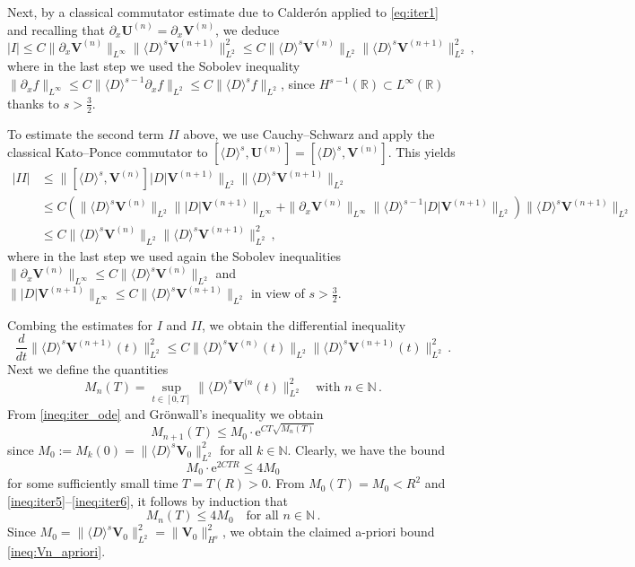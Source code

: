 \documentclass[11pt,reqno]{amsart}
\theoremstyle{definition}
\theoremstyle{remark}
\theoremstyle{remark}
\numberwithin{equation}{section}
\newcommand{\N}{\mathbb{N}}
\newcommand{\R}{\mathbb{R}}
\newcommand{\pt}{\partial}
\newcommand{\be}{\begin{equation}}
\newcommand{\ee}{\end{equation}}
\newcommand{\eu}{\mathrm{e}}
\newcommand{\Vb}{\mathbf{V}}
\newcommand{\Ub}{\mathbf{U}}
\newcommand{\Dsr}{\langle D \rangle}
\begin{document}
\begin{appendix}
Next, by a classical commutator estimate due to Calder\'on applied to \eqref{eq:iter1} and recalling that $\pt_x \Ub^{(n)} = \pt_x \Vb^{(n)}$, we deduce  
$$
|I|  \leq C \| \pt_x \Vb^{(n)} \|_{L^\infty} \| \Dsr^s \Vb^{(n+1)} \|_{L^2}^2 \leq C \| \Dsr^s  \Vb^{(n)} \|_{L^2}  \| \Dsr^s \Vb^{(n+1)} \|_{L^2}^2 \, ,
$$
where in the last step we used the Sobolev inequality $\| \pt_x f \|_{L^\infty}  \leq C \| \Dsr^{s-1} \pt_x f \|_{L^2} \leq C \| \Dsr^{s} f \|_{L^2}$, since $H^{s-1}(\R) \subset L^\infty(\R)$ thanks to $s > \frac{3}{2}$.

To estimate the second term $II$ above, we use Cauchy--Schwarz and apply the classical Kato--Ponce commutator to $[\Dsr^s, \Ub^{(n)}] = [\Dsr^s, \Vb^{(n)}]$. This yields
\begin{align*}
|II| & \leq \| [\Dsr^s, \Vb^{(n)}] |D| \Vb^{(n+1)} \|_{L^2} \| \Dsr^s \Vb^{(n+1)} \|_{L^2} \\
& \leq C ( \| \Dsr^s \Vb^{(n)} \|_{L^2} \| |D| \Vb^{(n+1)} \|_{L^\infty} + \| \pt_x \Vb^{(n)} \|_{L^\infty} \|  \Dsr^{s-1} |D| \Vb^{(n+1)} \|_{L^2}  ) \| \Dsr^s \Vb^{(n+1)} \|_{L^2} \\
& \leq C \| \Dsr^s \Vb^{(n)} \|_{L^2} \| \Dsr^s \Vb^{(n+1)} \|_{L^2}^2 \, ,
\end{align*}
where in the last step we used again the Sobolev inequalities $\| \pt_x \Vb^{(n)} \|_{L^\infty} \leq C \| \Dsr^s \Vb^{(n)} \|_{L^2}$ and $\| |D| \Vb^{(n+1)} \|_{L^\infty} \leq C \| \Dsr^s \Vb^{(n+1)} \|_{L^2}$ in view of $s > \frac{3}{2}$.


Combing the estimates for $I$ and $II$, we obtain the differential inequality
\be \label{ineq:iter_ode}
 \frac{d}{dt} \big \| \Dsr^s \Vb^{(n+1)}(t) \big \|_{L^2}^2  \leq C \| \Dsr^s \Vb^{(n)}(t) \|_{L^2} \| \Dsr^s \Vb^{(n+1)}(t) \|_{L^2}^2  \, .
\ee
Next we define the quantities
$$
M_n(T) = \sup_{t \in [0,T]} \big \| \Dsr^s \Vb^{(n}(t) \big \|_{L^2}^2 \quad \mbox{with $n \in \N$} \, .
$$
From \eqref{ineq:iter_ode} and Gr\"onwall's inequality we obtain
\be \label{ineq:iter5}
M_{n+1}(T) \leq M_0 \cdot \eu^{C T \sqrt{M_n(T)} }
\ee
since $M_0:=M_{k}(0) = \| \Dsr^s \Vb_0\|_{L^2}^2$ for all $k \in \N$. Clearly, we have the bound
\be \label{ineq:iter6}
M_0 \cdot \eu^{2CT R} \leq 4 M_0
\ee
for some sufficiently small time $T=T(R)> 0$. From $M_0(T) = M_0 < R^2$ and \eqref{ineq:iter5}--\eqref{ineq:iter6}, it follows by induction that 
$$
M_n(T) \leq 4M_0  \quad \mbox{for all $n \in \N$} \, .
$$
Since $M_0 = \| \Dsr^s \Vb_0 \|_{L^2}^2 = \| \Vb_0 \|_{H^s}^2$, we obtain the claimed a-priori bound \eqref{ineq:Vn_apriori}.


\end{appendix}
\end{document}
